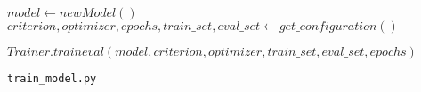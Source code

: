 \begin{algorithm}[htp]
    \footnotesize
    \SetAlgoLined

    \BlankLine
    \BlankLine
    \BlankLine

    $model \gets new Model()$\\
    $criterion, optimizer, epochs, train\_set, eval\_set \gets get\_configuration()$\BlankLine\BlankLine

    $Trainer.traineval(model, criterion, optimizer, train\_set, eval\_set, epochs)$\BlankLine\BlankLine

    \caption{\texttt{train\_model.py}}
    \label{alg:trainmodel}
\end{algorithm}